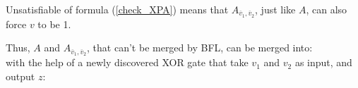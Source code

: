 \documentclass[journal]{IEEEtran}
\begin{document}
\begin{equation}\label{check_XPA}
\end{equation}

%
%
%
%
%
%
%

Unsatisfiable of formula (\ref{check_XPA}) means that $A_{\overline{v}_1,\overline{v}_2}$,
just like $A$,
can also force $v$ to be 1.

Thus,
$A$ and $A_{\overline{v}_1,\overline{v}_2}$,
that can't be merged by BFL,
can be merged into:
\begin{equation}\label{mergeA}
\end{equation}
with the help of a newly discovered XOR gate that take $v_1$ and $v_2$ as input,
and output $z$:
\begin{equation}
\end{equation}
\end{document}
